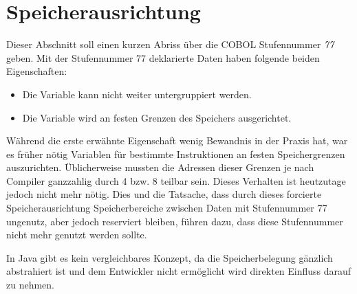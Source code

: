 \section{Speicherausrichtung}
Dieser Abschnitt soll einen kurzen Abriss über die COBOL Stufennummer \textit{77} geben. Mit der Stufennummer 77 deklarierte Daten haben folgende beiden Eigenschaften:

\begin{itemize}
    \item Die Variable kann nicht weiter untergruppiert werden.
    \item Die Variable wird an festen Grenzen des Speichers ausgerichtet.
\end{itemize}

Während die erste erwähnte Eigenschaft wenig Bewandnis in der Praxis hat, war es früher nötig Variablen für bestimmte Instruktionen an festen Speichergrenzen auszurichten. Üblicherweise mussten die Adressen dieser Grenzen je nach Compiler ganzzahlig durch 4 bzw. 8 teilbar sein. Dieses Verhalten ist heutzutage jedoch nicht mehr nötig. Dies und die Tatsache, dass durch dieses forcierte Speicherausrichtung Speicherbereiche zwischen Daten mit Stufennummer 77 ungenutz, aber jedoch reserviert bleiben, führen dazu, dass diese Stufennummer nicht mehr genutzt werden sollte.

In Java gibt es kein vergleichbares Konzept, da die Speicherbelegung gänzlich abstrahiert ist und dem Entwickler nicht ermöglicht wird direkten Einfluss darauf zu nehmen.